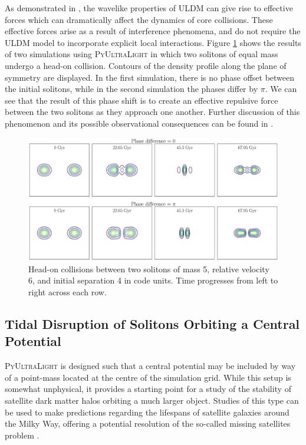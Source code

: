 \documentclass[a4paper,11pt]{article}
\newcommand{\PyUltraLight}{\textsc{PyUltraLight}\xspace}
\begin{document}
As demonstrated in \cite{Paredes2016}, the wavelike properties of ULDM can give rise to effective forces which can dramatically affect the dynamics of core collisions. These effective forces arise as a result of interference phenomena, and do not require the ULDM model to incorporate explicit local interactions. Figure \ref{fig:repulsion} shows the results of two simulations using \PyUltraLight in which two solitons of equal mass undergo a head-on collision. Contours of the density profile along the plane of symmetry are displayed. In the first simulation, there is no phase offset between the initial solitons, while in the second simulation the phases differ by $\pi$. We can see that the result of this phase shift is to create an effective repulsive force between the two solitons as they approach one another. Further discussion of this phenomenon and its possible observational consequences can be found in \cite{Paredes2016}.
\begin{figure}
  \includegraphics[width=1.\textwidth, trim={0 0 0 0},clip]{phase_comparison}
  \caption{Head-on collisions between two solitons of mass 5, relative velocity 6, and initial separation 4 in code units. Time progresses from left to right across each row.}
  \label{fig:repulsion}
\end{figure}

\vspace{1em}

\subsection{Tidal Disruption of Solitons Orbiting a Central Potential}\label{sec:disruption}

\PyUltraLight is designed such that a central potential may be included by way of a point-mass located at the centre of the simulation grid. While this setup is somewhat unphysical, it provides a starting point for a study of the stability of satellite dark matter halos orbiting a much larger object. Studies of this type can be used to make predictions regarding the lifespans of satellite galaxies around the Milky Way, offering a potential resolution of the so-called missing satellites problem \cite{Weinberg2015}.
\end{document}
